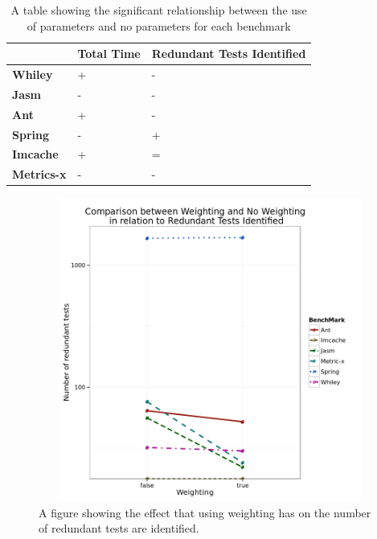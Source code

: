 \begin{table}[]
\centering
\caption{A table showing the significant relationship between the use of parameters and no parameters for each benchmark}
\label{weightingsig}
\begin{tabular}{|l|l|l|}
\hline
{\bf }          & {\bf Total Time} & {\bf Redundant Tests Identified} \\ \hline
{\bf Whiley}    & +                & -                           \\ \hline
{\bf Jasm}      & -                & -                           \\ \hline
{\bf Ant}       & +                & -                           \\ \hline
{\bf Spring}    & -                & +                           \\ \hline
{\bf Imcache}   & +                & =                           \\ \hline
{\bf Metrics-x} & -                & -                           \\ \hline
\end{tabular}
\end{table}


\begin{figure}[h]
\begin{center}
\includegraphics[height=10cm, width = 14.5cm]{Weighting.png}
\end{center}
\caption{A figure showing the effect that using weighting has on the number of redundant tests are identified.}
\label{fig:weightgraph}
\end{figure}

